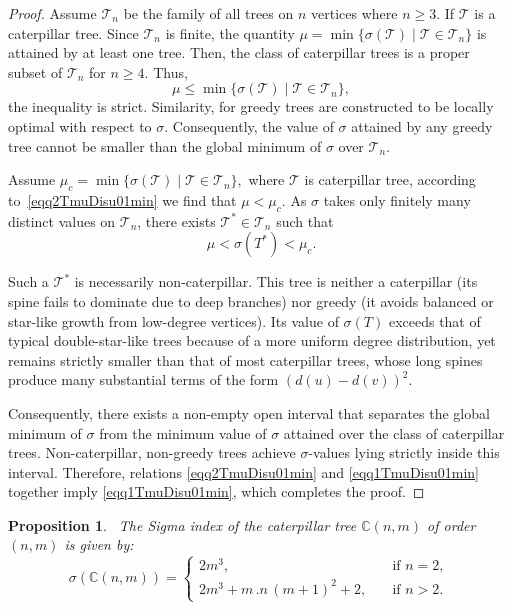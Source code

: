 \documentclass[12pt, a4paper]{article}
\theoremstyle{plain}  %
\newtheorem{proposition}{Proposition}[section]
\theoremstyle{definition}  %
\newcommand{\TT}{\mathcal{T}}
\newcommand{\CC}{\mathbb{C}}
\begin{document}
\begin{proof}
Assume $\mathcal{T}_n$ be the family of all trees on $n$ vertices where $n \geq 3$. If $\TT$ is a caterpillar tree. Since $\mathcal{T}_n$ is finite, the quantity $\mu=\min\{\sigma(\TT)\mid \TT\in\mathcal{T}_n\}$ is attained by at least one tree. Then, the class of caterpillar trees is a proper subset of $\mathcal{T}_n$ for $n\geqslant 4$. Thus, 
\begin{equation}~\label{eqq2TmuDisu01min}
\mu \leqslant \min\{\sigma(\TT)\mid \TT\in\mathcal{T}_n\},
\end{equation}
the inequality is strict. Similarity,  for greedy trees are constructed to be locally optimal with respect to $\sigma$. Consequently, the value of $\sigma$ attained by any greedy tree cannot be smaller than the global minimum of $\sigma$ over $\mathcal{T}_n$.

Assume $\mu_c=\min\{\sigma(\TT) \mid \TT \in \mathcal{T}_n\},$
where $\TT$ is caterpillar tree, according to~\eqref{eqq2TmuDisu01min} we find that $\mu<\mu_c$.
As $\sigma$ takes only finitely many distinct values on $\mathcal{T}_n$, there exists $\TT^\ast \in \mathcal{T}_n$ such that
\begin{equation}~\label{eqq3TmuDisu01min}
\mu<\sigma(T^\ast)<\mu_c.
\end{equation}

Such a $\TT^\ast$ is necessarily non-caterpillar.
This tree is neither a caterpillar (its spine fails to dominate due to deep branches) nor greedy (it avoids balanced or star-like growth from low-degree vertices). Its value of $\sigma(T)$ exceeds that of typical double-star-like trees because of a more uniform degree distribution, yet remains strictly smaller than that of most caterpillar trees, whose long spines produce many substantial terms of the form $(d(u)-d(v))^2$.

Consequently, there exists a non-empty open interval that separates the global minimum of $\sigma$ from the minimum value of $\sigma$ attained over the class of caterpillar trees. Non-caterpillar, non-greedy trees achieve $\sigma$-values lying strictly inside this interval. Therefore, relations \eqref{eqq2TmuDisu01min} and \eqref{eqq1TmuDisu01min} together imply \eqref{eqq1TmuDisu01min}, which completes the proof.
\end{proof}

\begin{proposition}~\label{pro.sig.1}
The Sigma index of the caterpillar tree $\CC(n,m)$ of order $(n,m)$ is given by:
\[
\sigma(\CC(n,m)) = \begin{cases}
2m^3, & \quad \text{if } n = 2, \\
2m^3 + m\,.n\,(m+1)^2+2, & \quad \text{if } n> 2.
\end{cases}
\]
\end{proposition}
\end{document}
